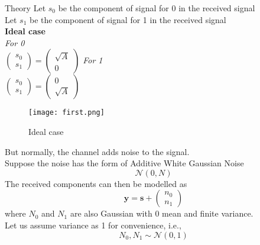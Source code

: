 \documentclass{beamer}
\begin{document}
\begin{frame}{Theory}
    Let $s_0$ be the component of signal for 0 in the received signal \\
    Let $s_1$ be the component of signal for 1 in the received signal \\
    \bigbreak
    \textbf{Ideal case} \\
    \bigbreak
    \textit{For 0} \\
    $\begin{pmatrix}
        s_0 \\
        s_1
    \end{pmatrix} =
    \begin{pmatrix}
        \sqrt{A} \\
        0
    \end{pmatrix}$
    \bigbreak
    \textit{For 1} \\
    $\begin{pmatrix}
        s_0 \\
        s_1
    \end{pmatrix} =
    \begin{pmatrix}
        0 \\
        \sqrt{A} 
    \end{pmatrix}$
\end{frame}
    
\begin{frame}{}
    \begin{figure}
        \centering
        \texttt{[image: first.png]}
        \caption{Ideal case}
        \label{fig:my_label}
    \end{figure}
\end{frame}

    
\begin{frame}{}
    But normally, the channel adds noise to the signal. \\ 
    Suppose the noise has the form of Additive White Gaussian Noise \\
    \[ \mathcal{N} (0, N)\] 
    \bigbreak 
    The received components can then be modelled as \\
    \[\textbf{y} = \textbf{s} + \begin{pmatrix} n_0 \\ n_1 \end{pmatrix}\]
    \bigbreak
    where $N_0$ and $N_1$ are also Gaussian with 0 mean and finite variance. \\
    Let us assume variance as 1 for convenience, i.e., 
    \[N_0, N_1 \sim \mathcal{N} (0, 1) \]
    \bigbreak
\end{frame}
\end{document}
